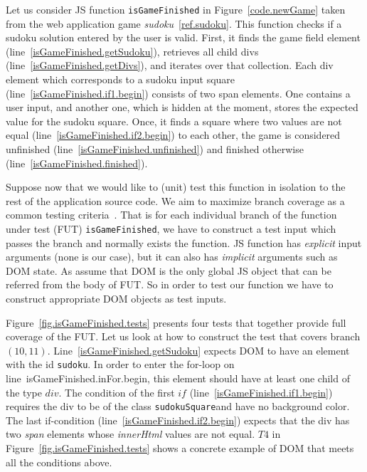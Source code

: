 \documentclass[sigconf]{acmart}
\begin{document}
Let us consider JS function \texttt{isGameFinished} in Figure~\ref{code.newGame} taken from the web application game \emph{sudoku}~\ref{ref.sudoku}. This function checks if a sudoku solution entered by the user is valid. First, it finds the game field element (line~\ref{isGameFinished.getSudoku}), retrieves all child divs (line~\ref{isGameFinished.getDivs}), and iterates over that collection. Each div element which corresponds to a sudoku input square (line~\ref{isGameFinished.if1.begin}) consists of two span elements. One contains a user input, and another one, which is hidden at the moment, stores the expected value for the sudoku square. Once, it finds a square where two values are not equal (line~\ref{isGameFinished.if2.begin}) to each other, the game is considered unfinished (line~\ref{isGameFinished.unfinished}) and finished otherwise (line~\ref{isGameFinished.finished}).

Suppose now that we would like to (unit) test this function in isolation to the rest of the application source code. We aim to maximize branch coverage as a common testing criteria~\cite{why_is_common}. That is for each individual branch of the function under test (FUT) \texttt{isGameFinished}, we have to construct a test input which passes the branch and normally exists the function. JS function has \emph{explicit} input arguments (none is our case), but it can also has \emph{implicit} arguments such as DOM state. As assume that DOM is the only global JS object that can be referred from the body of FUT. So in order to test our function we have to construct appropriate DOM objects as test inputs.   


Figure~\ref{fig.isGameFinished.tests} presents four tests that together provide full coverage of the FUT. Let us look at how to construct the test that covers branch $(10,11)$. Line~\ref{isGameFinished.getSudoku} expects DOM to have an element with the id \textquotesingle\texttt{sudoku}\textquotesingle. In order to enter the for-loop on line~{isGameFinished.inFor.begin}, this element should have at least one child of the type $div$. The condition of the first $if$ (line~\ref{isGameFinished.if1.begin}) requires the div to be of the class \textquotesingle\texttt{sudokuSquare}\textquotesingle and have no background color. The last if-condition (line~\ref{isGameFinished.if2.begin}) expects that the div has two \emph{span} elements whose \emph{innerHtml} values are not equal. $T4$ in Figure~\ref{fig.isGameFinished.tests} shows a concrete example of DOM that meets all the conditions above. 
\end{document}
